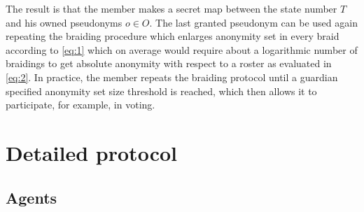 \documentclass[12pt]{article}
\begin{document}
The result is that the member makes a secret map between the state number $T$ and his owned pseudonyms $o \in O$. The last granted pseudonym can be used again repeating the braiding procedure which enlarges anonymity set in every braid according to \cref{eq:1} which on average would require about a logarithmic number of braidings to get absolute anonymity with respect to a roster as evaluated in \cref{eq:2}. In practice, the member repeats the braiding protocol until a guardian specified anonymity set size threshold is reached, which then allows it to participate, for example, in voting.



\section*{Detailed protocol}


\subsection*{Agents}
\end{document}
